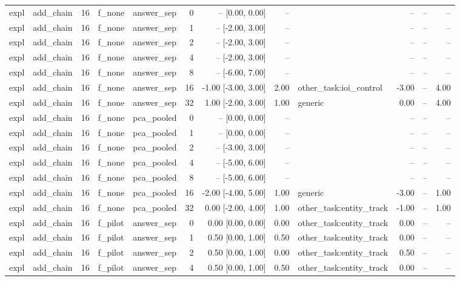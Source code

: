 \begin{tabular}{llrllrrrlrrr}
expl & add\_chain & 16 & f\_none & answer\_sep & 0 & -- [0.00, 0.00] & -- &  & -- & -- & -- \\
expl & add\_chain & 16 & f\_none & answer\_sep & 1 & -- [-2.00, 3.00] & -- &  & -- & -- & -- \\
expl & add\_chain & 16 & f\_none & answer\_sep & 2 & -- [-2.00, 3.00] & -- &  & -- & -- & -- \\
expl & add\_chain & 16 & f\_none & answer\_sep & 4 & -- [-2.00, 3.00] & -- &  & -- & -- & -- \\
expl & add\_chain & 16 & f\_none & answer\_sep & 8 & -- [-6.00, 7.00] & -- &  & -- & -- & -- \\
expl & add\_chain & 16 & f\_none & answer\_sep & 16 & -1.00 [-3.00, 3.00] & 2.00 & other\_task:ioi\_control & -3.00 & -- & 4.00 \\
expl & add\_chain & 16 & f\_none & answer\_sep & 32 & 1.00 [-2.00, 3.00] & 1.00 & generic & 0.00 & -- & 4.00 \\
expl & add\_chain & 16 & f\_none & pca\_pooled & 0 & -- [0.00, 0.00] & -- &  & -- & -- & -- \\
expl & add\_chain & 16 & f\_none & pca\_pooled & 1 & -- [0.00, 0.00] & -- &  & -- & -- & -- \\
expl & add\_chain & 16 & f\_none & pca\_pooled & 2 & -- [-3.00, 3.00] & -- &  & -- & -- & -- \\
expl & add\_chain & 16 & f\_none & pca\_pooled & 4 & -- [-5.00, 6.00] & -- &  & -- & -- & -- \\
expl & add\_chain & 16 & f\_none & pca\_pooled & 8 & -- [-5.00, 6.00] & -- &  & -- & -- & -- \\
expl & add\_chain & 16 & f\_none & pca\_pooled & 16 & -2.00 [-4.00, 5.00] & 1.00 & generic & -3.00 & -- & 1.00 \\
expl & add\_chain & 16 & f\_none & pca\_pooled & 32 & 0.00 [-2.00, 4.00] & 1.00 & other\_task:entity\_track & -1.00 & -- & 1.00 \\
expl & add\_chain & 16 & f\_pilot & answer\_sep & 0 & 0.00 [0.00, 0.00] & 0.00 & other\_task:entity\_track & 0.00 & -- & -- \\
expl & add\_chain & 16 & f\_pilot & answer\_sep & 1 & 0.50 [0.00, 1.00] & 0.50 & other\_task:entity\_track & 0.00 & -- & -- \\
expl & add\_chain & 16 & f\_pilot & answer\_sep & 2 & 0.50 [0.00, 1.00] & 0.00 & other\_task:entity\_track & 0.50 & -- & -- \\
expl & add\_chain & 16 & f\_pilot & answer\_sep & 4 & 0.50 [0.00, 1.00] & 0.50 & other\_task:entity\_track & 0.00 & -- & -- \\

\end{tabular}
